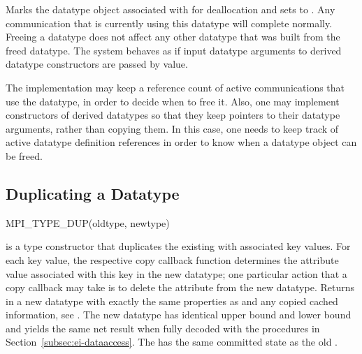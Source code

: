 Marks the datatype object associated with  for
deallocation and sets  to .
Any communication that is currently using this datatype will complete
normally.
%
Freeing a datatype does not affect any other datatype that was
built from the freed datatype.  The system behaves as if
input datatype arguments to derived datatype constructors are passed by value.

\begin{implementors}
The implementation may keep a reference count of active communications
that use the datatype, in order to decide when to free it.
Also, one may implement constructors of derived datatypes so that they keep
pointers to their datatype arguments, rather than copying them.  In this
case, one needs to keep track of active datatype definition references in order
to know when a datatype object can be freed.
\end{implementors}

\subsection{Duplicating a Datatype}
\label{sec:ei-dupdata}

\begin{funcdef}{MPI\_TYPE\_DUP}{(\mbox{oldtype}, \mbox{newtype})}
\end{funcdef}

 is
a type constructor
that duplicates the existing 
with associated key values.
For each key value, the respective copy
callback function determines the attribute value associated with this
key in the new datatype; one particular action that a copy
callback may take is to delete the attribute from the new datatype.
Returns in  a new datatype with exactly the same
properties as  and any copied cached
information, see .
The new datatype has identical
upper bound and lower bound and yields the same net result when fully
decoded with the procedures in Section~\ref{subsec:ei-dataaccess}.
The
 has the same committed state as the old
.

